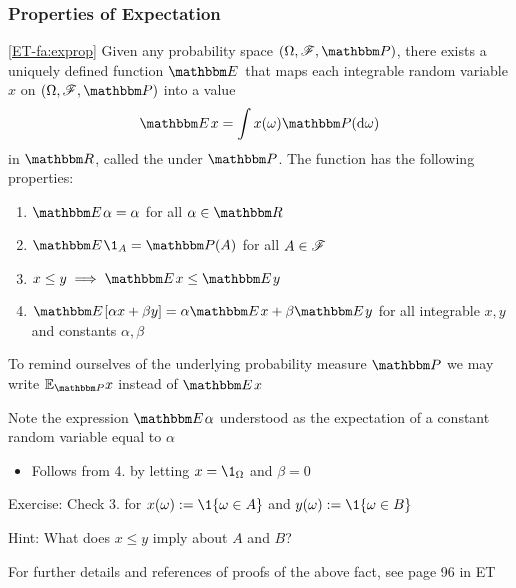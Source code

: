 \begin{frame}\frametitle{Properties of Expectation}

    \vspace{2em}
    \Fact\eqref{ET-fa:exprop}
        Given any probability space $(\Omega, \fF, \PP)$, there exists a uniquely
        defined function $\EE$ that maps each integrable random variable $x$
        on $(\Omega, \fF, \PP)$ into a value
        \begin{equation}
            \label{eq:ealm}
            \EE x = \int x(\omega) \PP(\diff \omega)
        \end{equation}
        in $\RR$, called the  under $\PP$.  The
        function has the following properties:
        \begin{enumerate}
            \item $\EE \alpha = \alpha$ for all $\alpha \in \RR$
            \item $\EE \1_A = \PP(A)$ for all $A \in \mathscr F$
            \item $x \leq y \implies \EE x \leq \EE y$
            \item $\EE [ \alpha x + \beta y ] = \alpha \EE x + \beta \EE y$ for
                all integrable $x, y$ and constants $\alpha, \beta$
        \end{enumerate}
        
\end{frame}

\begin{frame}

    \vspace{2em}
    To remind ourselves of the underlying probability measure $\PP$ we may
      write $\mathbb{E}_{\PP} x$ instead of $\EE x$
     
    \vspace{.7em}
    Note the expression $\EE \alpha$ understood as the expectation of a 
     constant random variable equal to $\alpha$
     \begin{itemize}
         \item Follows from 4. by letting $x = \1_{\Omega}$ and $\beta = 0$
     \end{itemize}
     
\end{frame}

\begin{frame}

    \vspace{2em}
    Exercise: Check 3. for $x(\omega) := \1\{\omega \in A\}$ and 
    $y(\omega) := \1\{\omega \in B\}$ 

    Hint: What does $x \leq y$ imply about $A$ and $B$?
    
    For further details and references of proofs of the above fact, see page 96 in ET
    
\end{frame}

